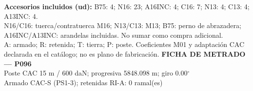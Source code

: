 \begingroup\scriptsize
\textbf{Accesorios incluidos (ud):} B75: 4; N16: 23; A16INC: 4; C16: 7; N13: 4; C13: 4; A13INC: 4.\\
N16/C16: tuerca/contratuerca M16; N13/C13: M13; B75: perno de abrazadera; A16INC/A13INC: arandelas incluidas. No sumar como compra adicional.\\
A: armado; R: retenida; T: tierra; P: poste. Coeficientes M01 y adaptación CAC declarada en el catálogo; no es plano de fabricación.
\endgroup\endgroup
\clearpage{}
\begingroup\small\setlength{\parskip}{3pt}\renewcommand{\arraystretch}{1.05}
\textbf{\large FICHA DE METRADO — P096}\\[4pt]
Poste CAC 15 m / 600 daN; progresiva 5848.098 m; giro 0.00\ensuremath{^\circ}\\
Armado CAC-S (PS1-3); retenidas RI-A: 0 ramal(es)\\
\begingroup\scriptsize
